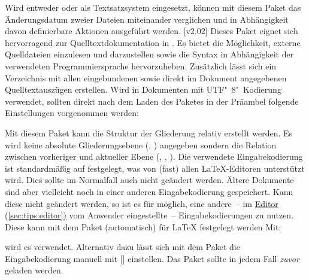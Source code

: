 \begin{DeclarePackages}
  Wird entweder  oder  als Textsatzsystem 
  eingesetzt, können mit diesem Paket das Änderungsdatum zweier Dateien 
  miteinander verglichen und in Abhängigkeit davon definierbare Aktionen 
  ausgeführt werden.
[v2.02]
  Dieses Paket eignet sich hervorragend zur Quelltextdokumentation in 
  . Es bietet die Möglichkeit, externe Quelldateien einzulesen 
  und darzustellen sowie die Syntax in Abhängigkeit der verwendeten 
  Programmiersprache hervorzuheben. Zusätzlich lässt sich ein Verzeichnis mit 
  allen eingebundenen sowie direkt im Dokument angegebenen Quelltextauszügen 
  erstellen. Wird  in Dokumenten mit UTF"~8"~Kodierung 
  verwendet, sollten direkt nach dem Laden des Paketes in der Präambel folgende 
  Einstellungen vorgenommen werden:
  \begin{Code}
  \end{Code}\vspace{-\baselineskip}%
  Mit diesem Paket kann die Struktur der Gliederung relativ erstellt werden. 
  Es wird keine absolute Gliederungsebene (, ) 
  angegeben sondern die Relation zwischen vorheriger und aktueller Ebene 
  (, , ).
  Die verwendete Eingabekodierung ist standardmäßig auf 
  festgelegt, was von (fast) allen \LaTeX-Editoren unterstützt wird. Dies 
  sollte im Normalfall auch nicht geändert werden. Ältere Dokumente sind aber 
  vielleicht noch in einer anderen Eingabekodierung gespeichert. Kann diese 
  nicht geändert werden, so ist es für  möglich, eine 
  andere~-- im \hyperref[sec:tips:editor]{Editor (\autoref{sec:tips:editor})} 
  vom Anwender eingestellte~-- Eingabekodierungen zu nutzen. Diese kann mit dem 
  Paket  (automatisch) für \LaTeX{} festgelegt werden Mit:
  \begin{Code}
    \usepackage{selinput}
  \end{Code}\vspace{-\baselineskip}%
  wird es verwendet. Alternativ dazu lässt sich mit dem Paket 
   die Eingabekodierung manuell mit  
  []  
  einstellen. Das Paket  sollte in jedem Fall \emph{zuvor}
  geladen werden.
\end{DeclarePackages}




